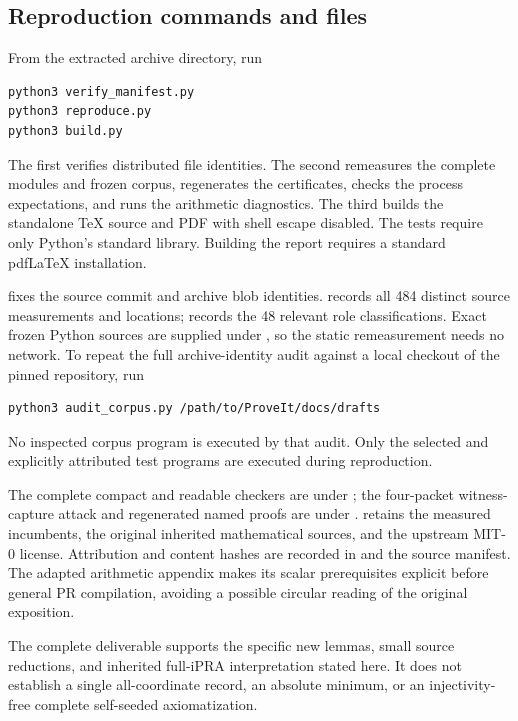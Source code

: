 \subsection{Reproduction commands and files}
From the extracted archive directory, run
\begin{verbatim}
python3 verify_manifest.py
python3 reproduce.py
python3 build.py
\end{verbatim}
The first verifies distributed file identities. The second remeasures the
complete modules and frozen corpus, regenerates the certificates, checks
the process expectations, and runs the arithmetic diagnostics. The third
builds the standalone TeX source and PDF with shell escape disabled.
The tests require only Python's standard library. Building the report
requires a standard pdfLaTeX installation.

 fixes the source commit and archive blob
identities.  records all 484 distinct
source measurements and locations; 
records the 48 relevant role classifications. Exact frozen Python
sources are supplied under , so the static
remeasurement needs no network. To repeat the full archive-identity audit
against a local checkout of the pinned repository, run
\begin{verbatim}
python3 audit_corpus.py /path/to/ProveIt/docs/drafts
\end{verbatim}
No inspected corpus program is executed by that audit. Only the selected
and explicitly attributed test programs are executed during reproduction.

The complete compact and readable checkers are under ;
the four-packet witness-capture attack and regenerated named proofs are
under .  retains the measured incumbents,
the original inherited mathematical sources, and the upstream MIT-0
license. Attribution and content hashes are recorded in
 and the source manifest.
The adapted arithmetic appendix makes its scalar prerequisites explicit
before general PR compilation, avoiding a possible circular reading of
the original exposition.

The complete deliverable supports the specific new lemmas, small source
reductions, and inherited full-iPRA interpretation stated here. It does
not establish a single all-coordinate record, an absolute minimum,
or an injectivity-free complete self-seeded axiomatization.
